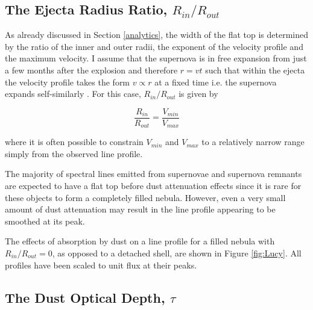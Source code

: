 \subsection{The Ejecta Radius Ratio, $R_{in}/R_{out}$}

As already discussed in Section \ref{analytics}, the width of the flat top 
is determined by the ratio of the inner and outer radii, the exponent of 
the velocity profile and the maximum velocity.  I assume that the 
supernova is in free expansion from just a few months after the explosion 
and therefore $r=vt$ such that within the ejecta the velocity profile 
takes the form $v \propto r$ at a fixed time i.e. the supernova expands 
self-similarly \citep{Li1992,Xu1992,Kozma1998b}.  For this case, 
$R_{in}/R_{out}$ is given by

\begin{equation}
\frac{R_{in}}{R_{out}}=\frac{V_{min}}{V_{max}}
\end{equation}

\noindent where it is often possible to constrain $V_{min}$ and $V_{max}$ 
to a relatively narrow range simply from the observed line profile.

The majority of spectral lines emitted from supernovae and supernova 
remnants are expected to have a flat top before dust attenuation effects 
since it is rare for these objects to form a completely filled nebula.  
However, even a very small amount of dust attenuation may result in the 
line profile appearing to be smoothed at its peak.

The effects of absorption by dust on a line profile for a filled nebula 
with $R_{in}/R_{out}=0$, as opposed to a detached shell, are shown in 
Figure \ref{fig:Lucy}. 
All profiles have been scaled to unit flux at their peaks.

\subsection{The Dust Optical Depth, $\tau$}
\label{tau}

